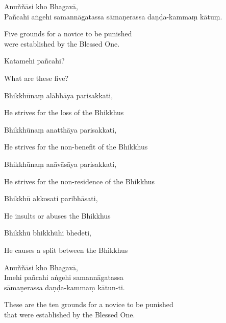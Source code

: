 
Anuññāsi kho Bhagavā,\\
Pañcahi aṅgehi samannāgatassa sāmaṇerassa daṇḍa-kammaṃ kātuṃ.

\begin{english}
  Five grounds for a novice to be punished\\
  were established by the Blessed One.
\end{english}

Katamehi pañcahi?

\begin{english}
  What are these five?
\end{english}

Bhikkhūnaṃ alābhāya parisakkati,

\begin{english}
  He strives for the loss of the Bhikkhus
\end{english}

Bhikkhūnaṃ anatthāya parisakkati,

\begin{english}
  He strives for the non-benefit of the Bhikkhus
\end{english}

Bhikkhūnaṃ anāvāsāya parisakkati,

\begin{english}
  He strives for the non-residence of the Bhikkhus
\end{english}

Bhikkhū akkosati paribhāsati,

\begin{english}
  He insults or abuses the Bhikkhus
\end{english}

Bhikkhū bhikkhūhi bhedeti,

\begin{english}
  He causes a split between the Bhikkhus
\end{english}

Anuññāsi kho Bhagavā,\\
Imehi pañcahi aṅgehi samannāgatassa\\
sāmaṇerassa daṇḍa-kammaṃ kātun-ti.

\begin{english}
  These are the ten grounds for a novice to be punished\\
  that were established by the Blessed One.
\end{english}


